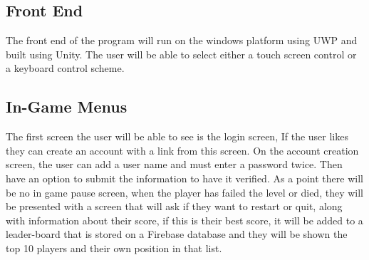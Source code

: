 \documentclass{article}
\begin{document}
\subsection{Front End}

The front end of the program will run on the windows platform using UWP and built using Unity. The user will be able to select either a touch screen control or a keyboard control scheme.

\subsection{In-Game Menus}

The first screen the user will be able to see is the login screen, If the user likes they can create an account with a link from this screen.
On the account creation screen, the user can add a user name and must enter a password twice. Then have an option to submit the information to have it verified. As a point there will be no in game pause screen, when the player has failed the level or died, they will be presented with a screen that will ask if they want to restart or quit, along with information about their score, if this is their best score, it will be added to a leader-board that is stored on a Firebase database and they will be shown the top 10 players and their own position in that list.
\end{document}

